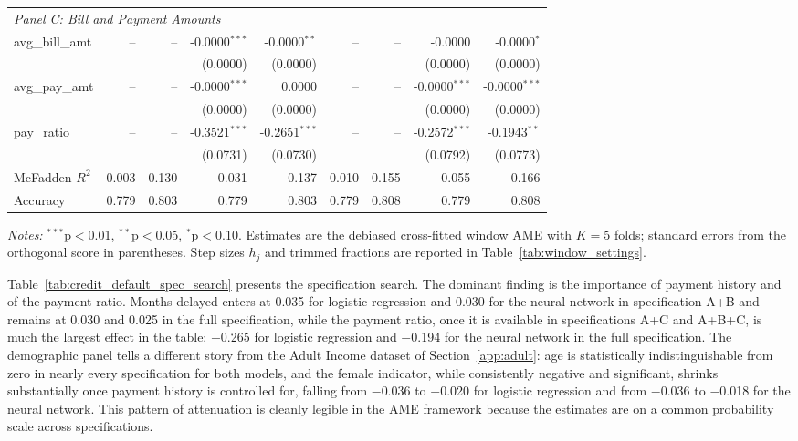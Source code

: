 \documentclass[12pt,a4paper]{article}
\numberwithin{equation}{section}
\theoremstyle{plain}
\theoremstyle{definition}
\begin{document}
\begin{table}[htbp]
{\begin{threeparttable}
\begin{tabular}{lrrrrrrrr}
					\midrule
					\multicolumn{9}{l}{\textit{Panel C: Bill and Payment Amounts}} \\
					\quad avg\_bill\_amt & -- & -- & -0.0000$^{***}$ & -0.0000$^{**}$ & -- & -- & -0.0000 & -0.0000$^{*}$ \\
					&  &  & (0.0000) & (0.0000) &  &  & (0.0000) & (0.0000) \\
					\quad avg\_pay\_amt & -- & -- & -0.0000$^{***}$ & 0.0000 & -- & -- & -0.0000$^{***}$ & -0.0000$^{***}$ \\
					&  &  & (0.0000) & (0.0000) &  &  & (0.0000) & (0.0000) \\
					\quad pay\_ratio & -- & -- & -0.3521$^{***}$ & -0.2651$^{***}$ & -- & -- & -0.2572$^{***}$ & -0.1943$^{**}$ \\
					&  &  & (0.0731) & (0.0730) &  &  & (0.0792) & (0.0773) \\
					\midrule
					McFadden $R^2$ & 0.003 & 0.130 & 0.031 & 0.137 & 0.010 & 0.155 & 0.055 & 0.166 \\
					Accuracy & 0.779 & 0.803 & 0.779 & 0.803 & 0.779 & 0.808 & 0.779 & 0.808 \\
					\bottomrule
					\end{tabular}
					\begin{tablenotes}
					\footnotesize
					\item \textit{Notes:} $^{***}$p$<$0.01, $^{**}$p$<$0.05, $^{*}$p$<$0.10. Estimates are the debiased cross-fitted window AME with $K=5$ folds; standard errors from the orthogonal score in parentheses. Step sizes $h_j$ and trimmed fractions are reported in Table~\ref{tab:window_settings}.
					\end{tablenotes}
			\end{threeparttable}
		}%
	\end{table}
	
	Table~\ref{tab:credit_default_spec_search} presents the specification search. The dominant finding is the importance of payment history and of the payment ratio. Months delayed enters at 0.035 for logistic regression and 0.030 for the neural network in specification A+B and remains at 0.030 and 0.025 in the full specification, while the payment ratio, once it is available in specifications A+C and A+B+C, is much the largest effect in the table: $-$0.265 for logistic regression and $-$0.194 for the neural network in the full specification. The demographic panel tells a different story from the Adult Income dataset of Section~\ref{app:adult}: age is statistically indistinguishable from zero in nearly every specification for both models, and the female indicator, while consistently negative and significant, shrinks substantially once payment history is controlled for, falling from $-$0.036 to $-$0.020 for logistic regression and from $-$0.036 to $-$0.018 for the neural network. This pattern of attenuation is cleanly legible in the AME framework because the estimates are on a common probability scale across specifications.
\end{document}
